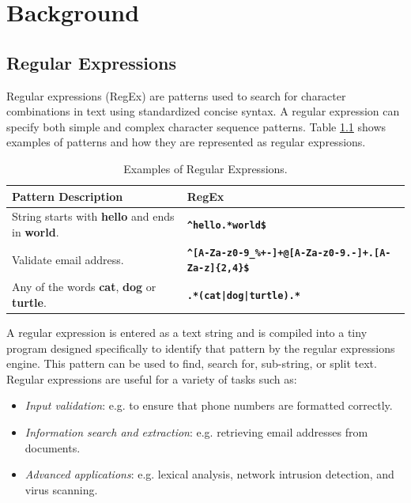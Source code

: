 \chapter{Background}\label{chapter:background}

\section{Regular Expressions}
Regular expressions (RegEx) are patterns used to search for character combinations in text using standardized concise syntax. A regular expression can specify both simple and complex character sequence patterns.  Table \ref{tab:regexsamp} shows examples of patterns and how they are represented as regular expressions.

{\renewcommand{\arraystretch}{1.6}%
\begin{table}[H]
\centering
\begin{adjustbox}{width=1.1\textwidth,center=\textwidth}
\small
\begin{tabular}{|l|l|}
\hline
Pattern Description       & RegEx  \\
\hline
String starts with \textbf{hello} and ends in \textbf{world}. & \texttt{\textbf{\^{}hello.*world\$}} \\
\hline
Validate email address. & \texttt{\textbf{\^{}[A-Za-z0-9\_\%+-]+@[A-Za-z0-9.-]+.[A-Za-z]\{2,4\}\$}} \\
\hline
Any of the words \textbf{cat}, \textbf{dog} or \textbf{turtle}. & \texttt{\textbf{.*(cat|dog|turtle).*}}\\
\hline
\end{tabular}
\end{adjustbox}
\caption{Examples of Regular Expressions.}\label{tab:regexsamp}
\end{table}}

A regular expression is entered as a text string and is compiled into a tiny program designed specifically to identify that pattern by the regular expressions engine. This pattern can be used to find, search for, sub-string, or split text. Regular expressions are useful for a variety of tasks such as:
 \begin{itemize}
     \item \textit{Input validation}: e.g. to ensure that phone numbers are formatted correctly.
     \item \textit{Information search and extraction}: e.g. retrieving email addresses from documents. \item \textit{Advanced applications}: e.g. lexical analysis, network intrusion detection, and virus scanning.
 \end{itemize}

